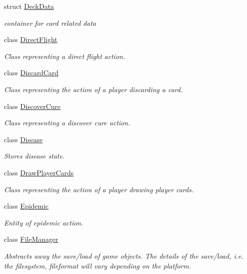 \begin{DoxyCompactItemize}
struct \hyperlink{structpan_1_1_deck_data}{Deck\+Data}
\begin{DoxyCompactList}\small\item\em container for card related data \end{DoxyCompactList}\item 
class \hyperlink{classpan_1_1_direct_flight}{Direct\+Flight}
\begin{DoxyCompactList}\small\item\em Class representing a direct flight action. \end{DoxyCompactList}\item 
class \hyperlink{classpan_1_1_discard_card}{Discard\+Card}
\begin{DoxyCompactList}\small\item\em Class representing the action of a player discarding a card. \end{DoxyCompactList}\item 
class \hyperlink{classpan_1_1_discover_cure}{Discover\+Cure}
\begin{DoxyCompactList}\small\item\em Class representing a discover cure action. \end{DoxyCompactList}\item 
class \hyperlink{classpan_1_1_disease}{Disease}
\begin{DoxyCompactList}\small\item\em Stores disease state. \end{DoxyCompactList}\item 
class \hyperlink{classpan_1_1_draw_player_cards}{Draw\+Player\+Cards}
\begin{DoxyCompactList}\small\item\em Class representing the action of a player drawing player cards. \end{DoxyCompactList}\item 
class \hyperlink{classpan_1_1_epidemic}{Epidemic}
\begin{DoxyCompactList}\small\item\em Entity of epidemic action. \end{DoxyCompactList}\item 
class \hyperlink{classpan_1_1_file_manager}{File\+Manager}
\begin{DoxyCompactList}\small\item\em Abstracts away the save/load of game objects. The details of the save/load, i.\+e. the filesystem, fileformat will vary depending on the platform. \end{DoxyCompactList}\item 

\end{DoxyCompactItemize}
